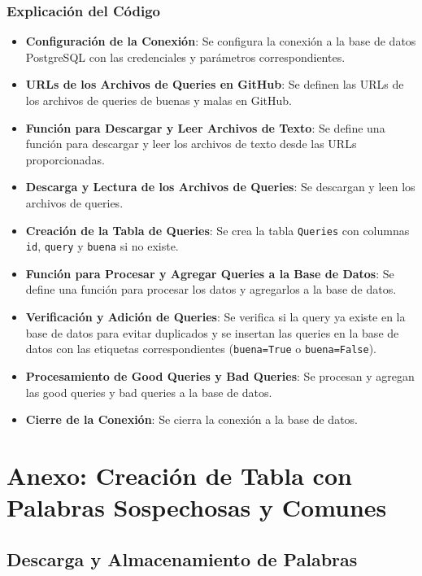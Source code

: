\subsection*{Explicación del Código}

\begin{itemize}
    \item \textbf{Configuración de la Conexión}: Se configura la conexión a la base de datos PostgreSQL con las credenciales y parámetros correspondientes.
    \item \textbf{URLs de los Archivos de Queries en GitHub}: Se definen las URLs de los archivos de queries de buenas y malas en GitHub.
    \item \textbf{Función para Descargar y Leer Archivos de Texto}: Se define una función para descargar y leer los archivos de texto desde las URLs proporcionadas.
    \item \textbf{Descarga y Lectura de los Archivos de Queries}: Se descargan y leen los archivos de queries.
    \item \textbf{Creación de la Tabla de Queries}: Se crea la tabla \texttt{Queries} con columnas \texttt{id}, \texttt{query} y \texttt{buena} si no existe.
    \item \textbf{Función para Procesar y Agregar Queries a la Base de Datos}: Se define una función para procesar los datos y agregarlos a la base de datos.
    \item \textbf{Verificación y Adición de Queries}: Se verifica si la query ya existe en la base de datos para evitar duplicados y se insertan las queries en la base de datos con las etiquetas correspondientes (\texttt{buena=True} o \texttt{buena=False}).
    \item \textbf{Procesamiento de Good Queries y Bad Queries}: Se procesan y agregan las good queries y bad queries a la base de datos.
    \item \textbf{Cierre de la Conexión}: Se cierra la conexión a la base de datos.
\end{itemize}




\chapter*{Anexo: Creación de Tabla con Palabras Sospechosas y Comunes}

\section*{Descarga y Almacenamiento de Palabras}

